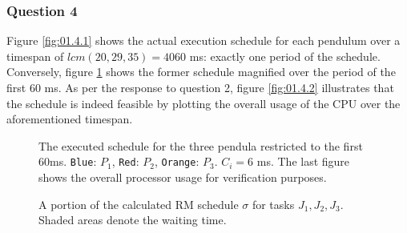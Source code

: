 \subsubsection{Question 4}

Figure \ref{fig:01.4.1} shows the actual execution schedule for each pendulum
over a timespan of $lcm(20,29,35) = 4060$ ms: exactly one period of the schedule.
Conversely, figure \ref{fig:01.4.1.small} shows the former schedule magnified
over the period of the first 60 ms.
As per the response to question 2, figure \ref{fig:01.4.2} illustrates that the
schedule is indeed feasible by plotting the overall usage of the CPU over the
aforementioned timespan.

\begin{sidewaysfigure}
  \begin{figure}[H]\centering
    \scalebox{1}{}
    \caption{The executed schedule for the three pendula restricted to the first
      60ms. \texttt{Blue}: $P_1$, \texttt{Red}: $P_2$,
      \texttt{Orange}: $P_3$. $C_i = 6$ ms. The last figure shows the overall
      processor usage for verification purposes.}
    \label{fig:01.4.1.small}
  \end{figure}

  \begin{figure}[H]\centering
    \scalebox{0.7}{}
    \caption{A portion of the calculated RM schedule $\sigma$ for tasks
      $J_1, J_2, J_3$.  Shaded areas denote the waiting time.}
    \label{fig:rm_6}
  \end{figure}
\end{sidewaysfigure}

\noindent{}
